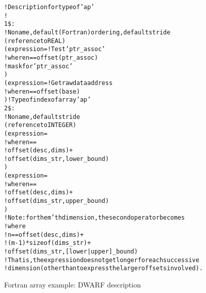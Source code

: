 \begin{figure}[h]
\begin{dwflisting}
\begin{alltt}
! Description for type of 'ap'
!
1\$: \DWTAGarraytype
        ! No name, default (Fortran) ordering, default stride
        \DWATtype(reference to REAL)
        \DWATassociated(expression=    ! Test 'ptr\_assoc' 
            \DWOPpushobjectaddress
            \DWOPlitn                ! where n == offset(ptr\_assoc)
            \DWOPplus
            \DWOPderef
            \DWOPlitone                  ! mask for 'ptr\_assoc' 
            \DWOPand)
        \DWATdatalocation(expression= ! Get raw data address
            \DWOPpushobjectaddress
            \DWOPlitn                ! where n == offset(base)
            \DWOPplus
            \DWOPderef)                ! Type of index of array 'ap'
2\$:     \DWTAGsubrangetype
            ! No name, default stride
            \DWATtype(reference to INTEGER)
            \DWATlowerbound(expression=
                \DWOPpushobjectaddress
                \DWOPlitn             ! where n ==
                                         !   offset(desc, dims) +
                                         !   offset(dims\_str, lower\_bound)
                \DWOPplus
                \DWOPderef)
            \DWATupperbound(expression=
                \DWOPpushobjectaddress
                \DWOPlitn            ! where n ==
                                        !   offset(desc, dims) +
                                        !   offset(dims\_str, upper\_bound)
                \DWOPplus
                \DWOPderef)
            !  Note: for the m'th dimension, the second operator becomes
            !  \DWOPlitn where
            !       n == offset(desc, dims)          +
            !                (m-1)*sizeof(dims\_str)  +
            !                 offset(dims\_str, [lower|upper]\_bound)
            !  That is, the expression does not get longer for each successive 
            !  dimension (other than to express the larger offsets involved).
\end{alltt}
\end{dwflisting}
\caption{Fortran array example: DWARF description}
\label{fig:fortranarrayexampledwarfdescription}
\end{figure}

